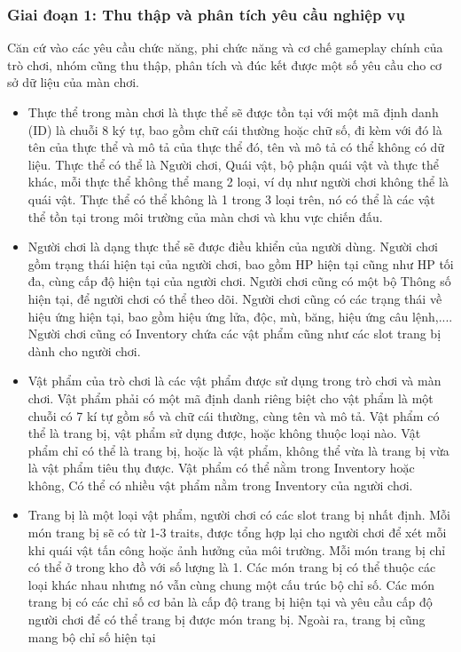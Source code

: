 \subsubsection{Giai đoạn 1: Thu thập và phân tích yêu cầu nghiệp vụ}
\hspace*{0.5cm} Căn cứ vào các yêu cầu chức năng, phi chức năng và cơ chế gameplay chính của trò chơi, nhóm cũng thu thập, phân tích và đúc kết được một số yêu cầu cho cơ sở dữ liệu của màn chơi.
\begin{itemize}
	\item Thực thể trong màn chơi là thực thể sẽ được tồn tại với một mã định danh (ID) là chuỗi 8 ký tự, bao gồm chữ cái thường hoặc chữ số, đi kèm với đó là tên của thực thể và mô tả của thực thể đó, tên và mô tả có thể không có dữ liệu. Thực thể có thể là Người chơi, Quái vật, bộ phận quái vật và thực thể khác, mỗi thực thể không thể mang 2 loại, ví dụ như người chơi không thể là quái vật. Thực thể có thể không là 1 trong 3 loại trên, nó có thể là các vật thể tồn tại trong môi trường của màn chơi và khu vực chiến đấu.
	
	\item Người chơi là dạng thực thể sẽ được điều khiển của người dùng. Người chơi gồm trạng thái hiện tại của người chơi, bao gồm HP hiện tại cũng như HP tối đa, cùng cấp độ hiện tại của người chơi. Người chơi cũng có một bộ Thông số hiện tại, để người chơi có thể theo dõi. Người chơi cũng có các trạng thái về hiệu ứng hiện tại, bao gồm hiệu ứng lửa, độc, mù, băng, hiệu ứng câu lệnh,.... Người chơi cũng có Inventory chứa các vật phẩm cũng như các slot trang bị dành cho người chơi.
	
	\item Vật phẩm của trò chơi là các vật phẩm được sử dụng trong trò chơi và màn chơi. Vật phẩm phải có một mã định danh riêng biệt cho vật phẩm là một chuỗi có 7 kí tự gồm số và chữ cái thường, cùng tên và mô tả. Vật phẩm có thể là trang bị, vật phẩm sử dụng được, hoặc không thuộc loại nào. Vật phẩm chỉ có thể là trang bị, hoặc là vật phẩm, không thể vừa là trang bị vừa là vật phẩm tiêu thụ được. Vật phẩm có thể nằm trong Inventory hoặc không, Có thể có nhiều vật phẩm nằm trong Inventory của người chơi.
	
	\item Trang bị là một loại vật phẩm, người chơi có các slot trang bị nhất định. Mỗi món trang bị sẽ có từ 1-3 traits, được tổng hợp lại cho người chơi để xét mỗi khi quái vật tấn công hoặc ảnh hưởng của môi trường. Mỗi món trang bị chỉ có thể ở trong kho đồ với số lượng là 1. Các món trang bị có thể thuộc các loại khác nhau nhưng nó vẫn cùng chung một cấu trúc bộ chỉ số. Các món trang bị có các chỉ số cơ bản là cấp độ trang bị hiện tại và yêu cầu cấp độ người chơi để có thể trang bị được món trang bị. Ngoài ra, trang bị cũng mang bộ chỉ số hiện tại
	

\end{itemize}
